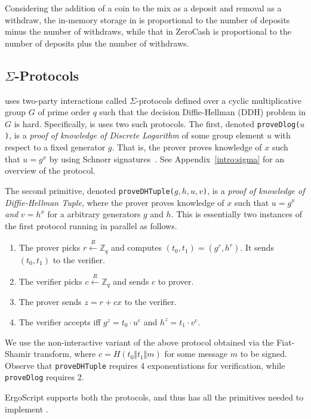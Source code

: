 \documentclass[runningheads]{llncs}
\newcommand{\langname}{ErgoScript\xspace}
\begin{document}
Considering the addition of a coin to the mix as a deposit and removal as a withdraw, the in-memory storage in \algname is proportional to the number of deposits minus the number of withdraws, while that in ZeroCash is proportional to the number of deposits plus the number of withdraws.  

\subsection{$\Sigma$-Protocols} 

\algname uses two-party interactions called $\Sigma$-protocols defined over a cyclic multiplicative group $G$ of prime order $q$ such that the decision Diffie-Hellman (DDH) problem in $G$ is hard. Specifically, is uses two such protocols. The first, denoted \texttt{proveDlog($u$)}, is a {\em proof of knowledge of Discrete Logarithm} of some group element $u$ with respect to a fixed generator $g$. That is, the prover proves knowledge of $x$ such that $u = g^x$ by using Schnorr signatures~\cite{Sch91}. See Appendix~\ref{intro:sigma} for an overview of the protocol. 

The second primitive, denoted \texttt{proveDHTuple($g, h, u, v$)}, is a {\em proof of knowledge of Diffie-Hellman Tuple}, where the prover proves knowledge of $x$ such that $u = g^x$ {\em and} $v = h^x$ for a arbitrary generators $g$ and $h$. This is essentially two instances of the first protocol running in parallel as follows.

\begin{enumerate}
	\item The prover picks $r \stackrel{R}{\leftarrow} \mathbb{Z}_q$ and computes $(t_0, t_1) = ({g}^r, {h}^r)$. It sends $(t_0, t_1)$ to the verifier.
	\item The verifier picks $c \stackrel{R}{\leftarrow} \mathbb{Z}_q$ and sends $c$ to prover.
	\item The prover sends $z = r + cx$ to the verifier. 
	\item The verifier accepts iff ${g}^z = {t_0}\cdot {u}^c$ and $h^z=t_1\cdot v^c$.
\end{enumerate}

We use the non-interactive variant of the above protocol obtained via the Fiat-Shamir transform, where $c = H(t_0 \Vert t_1\Vert m)$ for some message $m$ to be signed.  Observe that \texttt{proveDHTuple} requires 4 exponentiations for verification, while \texttt{proveDlog} requires 2. 

\langname supports both the protocols, and thus has all the primitives needed to implement \algname.
\end{document}
